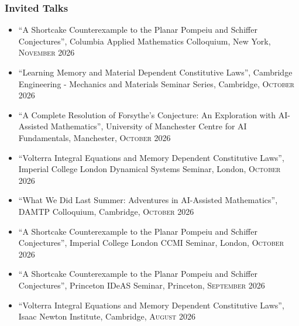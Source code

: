 \documentclass[a4paper,10pt]{article}
\newcommand{\faPaperclip}{{\ResumeLinkFont\symbol{"F0C6}}}
\begin{document}
\subsubsection*{Invited Talks}
\begin{itemize}
\item ``A Shortcake Counterexample to the Planar Pompeiu and Schiffer Conjectures'', Columbia Applied Mathematics Colloquium, New York, \textsc{November} 2026 \href{\detokenize{https://www.physics.columbia.edu/events/applied-math-colloquium-george-stepaniants-u-cambridge}}{\faPaperclip}

\item ``Learning Memory and Material Dependent Constitutive Laws'', Cambridge Engineering - Mechanics and Materials Seminar Series, Cambridge, \textsc{October} 2026 \href{\detokenize{https://talks.cam.ac.uk/talk/index/273296/}}{\faPaperclip}

\item ``A Complete Resolution of Forsythe's Conjecture: An Exploration with AI-Assisted Mathematics'', University of Manchester Centre for AI Fundamentals, Manchester, \textsc{October} 2026

\item ``Volterra Integral Equations and Memory Dependent Constitutive Laws'', Imperial College London Dynamical Systems Seminar, London, \textsc{October} 2026 \href{\detokenize{https://www.imperial.ac.uk/events/215496/dynamical-systems-seminar-george-stepaniants/}}{\faPaperclip}

\item ``What We Did Last Summer: Adventures in AI-Assisted Mathematics'', DAMTP Colloquium, Cambridge, \textsc{October} 2026

\item ``A Shortcake Counterexample to the Planar Pompeiu and Schiffer Conjectures'', Imperial College London CCMI Seminar, London, \textsc{October} 2026 \href{\detokenize{https://www.imperial.ac.uk/events/214613/ccmi-seminar-george-stepaniants-university-of-cambridge/}}{\faPaperclip}

\item ``A Shortcake Counterexample to the Planar Pompeiu and Schiffer Conjectures'', Princeton IDeAS Seminar, Princeton, \textsc{September} 2026 \href{\detokenize{https://www.pacm.princeton.edu/events/shortcake-counterexample-planar-pompeiu-and-schiffer-conjectures}}{\faPaperclip}

\item ``Volterra Integral Equations and Memory Dependent Constitutive Laws'', Isaac Newton Institute, Cambridge, \textsc{August} 2026


\end{itemize}
\end{document}
